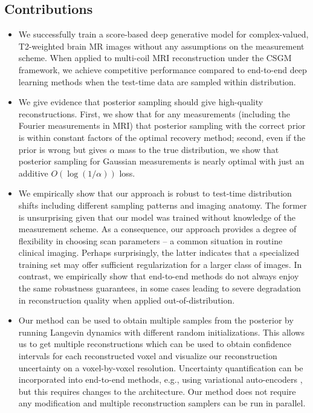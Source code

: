 \subsection{Contributions}
\begin{itemize}[leftmargin = *]

    \item We successfully train a score-based deep generative model
        for complex-valued, T2-weighted brain MR images without any
        assumptions on the measurement scheme. When applied to
        multi-coil MRI reconstruction under the CSGM framework, we
        achieve competitive performance compared to end-to-end deep
        learning methods when the test-time data are sampled within
        distribution.
    \item We give evidence that posterior sampling should give
        high-quality reconstructions.  First, we show that for any
        measurements (including the Fourier measurements in MRI) that
        posterior sampling with the correct prior is within constant
        factors of the optimal recovery method; second, even if the
        prior is wrong but gives $\alpha$ mass to the true
        distribution, we show that posterior sampling for Gaussian
        measurements is nearly optimal with just an additive
        $O(\log(1/\alpha))$ loss.
    \item We empirically show that our approach is robust to test-time
        distribution shifts including different sampling patterns and
        imaging anatomy.  The former is unsurprising given that our
        model was trained without knowledge of the measurement scheme.
        As a consequence, our approach provides a degree of
        flexibility in choosing scan parameters -- a common situation
        in routine clinical imaging. Perhaps surprisingly, the latter
        indicates that a specialized training set may offer sufficient
        regularization for a larger class of images.  In contrast, we
        empirically show that end-to-end methods do not always enjoy
        the same robustness guarantees, in some cases leading to
        severe degradation in reconstruction quality when applied
        out-of-distribution. 
    \item Our method can be used to obtain multiple samples from the
        posterior by running Langevin dynamics with different random
        initializations. This allows us to get multiple
        reconstructions which can be used to obtain confidence
        intervals for each reconstructed voxel and visualize our
        reconstruction uncertainty on a voxel-by-voxel resolution.
        Uncertainty quantification can be incorporated into end-to-end
        methods, e.g., using variational auto-encoders
        \cite{mardani2021mriuncertainty}, but this requires changes to
        the architecture. Our method does not require any modification
        and multiple reconstruction samplers can be run in parallel.
\end{itemize}
        
